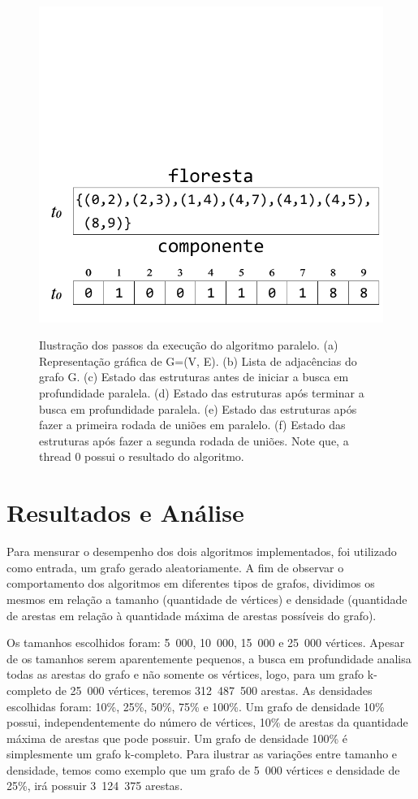 \documentclass[12pt]{article}
\begin{document}
\begin{figure}[H]
{		\includegraphics[width=\linewidth]{figF.pdf}
	}
	\caption{Ilustração dos passos da execução do algoritmo paralelo. (a) Representação gráfica de G=(V, E). (b) Lista de adjacências do grafo G. (c) Estado das estruturas antes de iniciar a busca em profundidade paralela. (d) Estado das estruturas após terminar a busca em profundidade paralela. (e) Estado das estruturas após fazer a primeira rodada de uniões em paralelo. (f) Estado das estruturas após fazer a segunda rodada de uniões. Note que, a thread 0 possui o resultado do algoritmo.}
		\label{fig:1}
\end{figure}

\newpage
\section{Resultados e Análise}

Para mensurar o desempenho dos dois algoritmos implementados, foi utilizado como entrada, um grafo gerado aleatoriamente. A fim de observar o comportamento dos algoritmos em diferentes tipos de grafos, dividimos os mesmos em relação a tamanho (quantidade de vértices) e densidade (quantidade de arestas em relação à quantidade máxima de arestas possíveis do grafo).

Os tamanhos escolhidos foram: 5~000, 10~000, 15~000 e 25~000 vértices. Apesar de os tamanhos serem aparentemente pequenos, a busca em profundidade analisa todas as arestas do grafo e não somente os vértices, logo, para um grafo k-completo de 25~000 vértices, teremos 312~487~500 arestas. As densidades escolhidas foram: 10\%, 25\%, 50\%, 75\% e 100\%. Um grafo de densidade 10\% possui, independentemente do número de vértices, 10\% de arestas da quantidade máxima de arestas que pode possuir. Um grafo de densidade 100\% é simplesmente um grafo k-completo. Para ilustrar as variações entre tamanho e densidade, temos como exemplo que um grafo de 5~000 vértices e densidade de 25\%, irá possuir 3~124~375 arestas.
\end{document}
